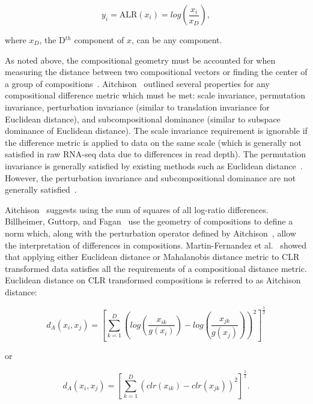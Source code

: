 \begin{equation}
y_i  = \text{ALR}(x_i) = log \left(\frac{x_i}{x_D} \right),
\label{alr}
\end{equation}

where $x_D$, the D$^{th}$ component of $x$, can be any component.   

As noted above, the compositional geometry must be accounted for when measuring the distance between two compositional vectors or finding the center of a group of compositions~\cite{Aitchison2000}.  Aitchison~\cite{Aitchison1992} outlined several properties for any compositional difference metric which must be met: scale invariance, permutation invariance, perturbation invariance (similar to translation invariance for Euclidean distance), and subcompositional dominance (similar to subspace dominance of Euclidean distance).  The scale invariance requirement is ignorable if the difference metric is applied to data on the same scale (which is generally not satisfied in raw RNA-seq data due to differences in read depth). The permutation invariance is generally satisfied by existing methods such as Euclidean distance~\cite{Martin-Fernandez1998}. However, the perturbation invariance and subcompositional dominance are not generally satisfied~\cite{Martin-Fernandez1998}. 

Aitchison~\cite{Aitchison1986, Aitchison1992} suggests using the sum of squares of all log-ratio differences.  Billheimer, Guttorp, and Fagan~\cite{Billheimer2001} use the geometry of compositions to define a norm which, along with the perturbation operator defined by Aitchison~\cite{Aitchison1986}, allow the interpretation of differences in compositions. Martin-Fernandez et al.~\cite{Martin-Fernandez1998} showed that applying either Euclidean distance or Mahalanobis distance metric to CLR transformed data satisfies all the requirements of a compositional distance metric. Euclidean distance on CLR transformed compositions is referred to as Aitchison distance:

\begin{equation}
d_A(x_i, x_j) = \left[\sum_{k=1}^D \left( log \left(\frac{x_{ik}}{g(x_i)} \right) - log \left(\frac{x_{jk}}{g(x_j)} \right) \right)^2  \right]^\frac{1}{2}
\label{aitchdist1}
\end{equation}


or

\begin{equation}
d_A(x_i, x_j) = \left[\sum_{k=1}^D \left( clr(x_{ik}) - clr(x_{jk}) \right)^2  \right]^\frac{1}{2}.
\label{aitchdist2}
\end{equation}
\\


